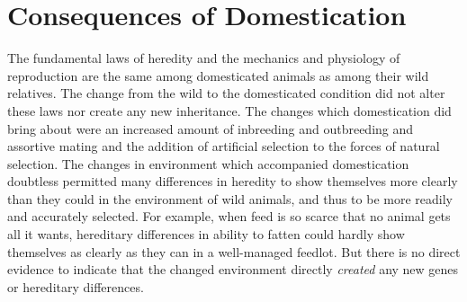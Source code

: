 \chapter{Consequences of Domestication}
\label{cha:consequences-of-domestication}

The fundamental laws of heredity and the mechanics and physiology of reproduction are the same among domesticated animals as 
among their wild relatives. The change from the wild to the domesticated condition did not alter these laws nor create any 
new inheritance. The changes which domestication did bring about were an increased amount of inbreeding and outbreeding and 
assortive mating and the addition of artificial selection to the forces of natural selection. The changes in environment 
which accompanied domestication doubtless permitted many differences in heredity to show themselves more clearly than they 
could in the environment of wild animals, and thus to be more readily and accurately selected. For example, when feed is so 
scarce that no animal gets all it wants, hereditary differences in ability to fatten could hardly show themselves as clearly 
as they can in a well-managed feedlot. But there is no direct evidence to indicate that the changed environment directly 
\textit{created} any new genes or hereditary differences.

